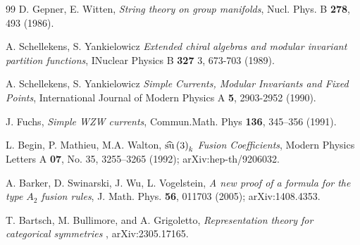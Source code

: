 \documentclass[a4paper,11pt]{article}
\theoremstyle{plain}
\theoremstyle{definition}
\begin{document}
\begin{thebibliography}{99}
 D. Gepner, E. Witten, \emph{String theory on group manifolds}, Nucl. Phys. B \textbf{278}, 493 (1986).





 A. Schellekens, S. Yankielowicz
\emph{Extended chiral algebras and modular invariant partition functions},
INuclear Physics B \textbf{327} 3, 673-703 (1989).

 A. Schellekens, S. Yankielowicz
\emph{Simple Currents, Modular Invariants and Fixed Points},
International Journal of Modern Physics A {\bf 5}, 2903-2952 (1990).



 J. Fuchs, 
\emph{Simple WZW currents},
Commun.Math. Phys {\bf 136}, 345–356 (1991).


 L. Begin, P. Mathieu, M.A. Walton, 
\emph{$\widehat{{\rm su}
}\left( 3 \right)_k $ Fusion Coefficients},
Modern Physics Letters A {\bf 07}, No. 35, 3255–3265 (1992);	arXiv:hep-th/9206032.

 A. Barker, D. Swinarski, J. Wu, L. Vogelstein,
\emph{A new proof of a formula for the type $A_2$ fusion rules},
J. Math. Phys. {\bf 56}, 011703 (2005); 	arXiv:1408.4353.



 T. Bartsch,  M. Bullimore, and A. Grigoletto, \emph{Representation theory for categorical symmetries
}, arXiv:2305.17165.



\end{thebibliography}
\end{document}
